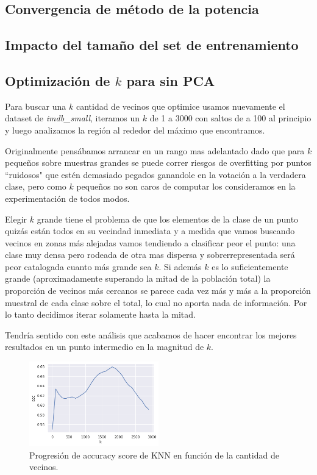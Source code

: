 \subsection{Convergencia de método de la potencia}%
\label{sub:pm}


\subsection{Impacto del tamaño del set de entrenamiento}%
\label{sub:exp_training_set}


\subsection{Optimización de $k$ para \knn{} sin PCA}%
\label{sub:knn_sin_pca}

Para buscar una $k$ cantidad de vecinos que optimice \knn{} usamos nuevamente el dataset de \textit{imdb\_small}, iteramos un $k$ de 1 a 3000 con saltos de a 100 al principio y luego analizamos la región al rededor del máximo que encontramos.

Originalmente pensábamos arrancar en un rango mas adelantado dado que para $k$ pequeños sobre muestras grandes se puede correr riesgos de overfitting por puntos ``ruidosos" que estén demasiado pegados ganandole en la votación a la verdadera clase, pero como $k$ pequeños no son caros de computar los consideramos en la experimentación de todos modos.

Elegir $k$ grande tiene el problema de que los elementos de la clase de un punto quizás están todos en su vecindad inmediata y a medida que vamos buscando vecinos en zonas más alejadas vamos tendiendo a clasificar peor el punto: una clase muy densa pero rodeada de otra mas dispersa y sobrerrepresentada será peor catalogada cuanto más grande sea $k$. Si además $k$ es lo suficientemente grande (aproximadamente superando la mitad de la población total) la proporción de vecinos más cercanos se parece cada vez más y más a la proporción muestral de cada clase sobre el total, lo cual no aporta nada de información. Por lo tanto decidimos iterar solamente hasta la mitad.

Tendría sentido con este análisis que acabamos de hacer encontrar los mejores resultados en un punto intermedio en la magnitud de $k$.

\begin{figure}[h]
\includegraphics[width=0.5\textwidth]{./img/knn.png}
\centering
\caption{Progresión de accuracy score de KNN en función de la cantidad de vecinos.\label{fig:knn_acc}}

\end{figure}

